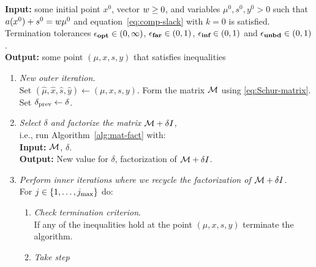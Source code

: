 \documentclass{article}
\begin{document}
\begin{algorithm}[H]
\textbf{Input:} some initial point $x^{0}$, vector $w \ge 0$, and variables $\mu^0, s^{0}, y^{0} > 0$  such that $a(x^{0}) + s^{0} = w \mu^{0}$ and equation~\eqref{eq:comp-slack} with $k=0$ is satisfied. Termination tolerances $\epsilon_{\textbf{opt}} \in (0,\infty)$, $\epsilon_{\textbf{far}} \in (0,1)$, $\epsilon_{\textbf{inf}} \in (0,1)$ and $\epsilon_{\textbf{unbd}} \in (0,1)$. \\
\textbf{Output:} some point $(\mu, x, s, y)$ that satisfies inequalities \termination{}
\vspace{0.1 cm} %
\begin{enumerate}[label*=A.{\arabic*}]
\item \label{line:form-K}  \emph{New outer iteration.} \\
Set $(\hat{\mu}, \hat{x}, \hat{s}, \hat{y}) \gets (\mu, x, s, y)$. Form the matrix $\mathcal{M}$ using \eqref{eq:Schur-matrix}. Set $\delta_{\text{prev}} \gets \delta$.
\item \emph{Select $\delta$ and factorize the matrix $\mathcal{M} + \delta I$,} \\
i.e., run Algorithm~\ref{alg:mat-fact} with: \\
\hspace*{0.1cm}  \textbf{Input:} $\mathcal{M}$, $\delta$. \\
\hspace*{0.1cm} \textbf{Output:} New value for $\delta$, factorization of $\mathcal{M} + \delta I$.
\item \label{take-steps}  \emph{Perform inner iterations where we recycle the factorization of $\mathcal{M} + \delta I$.} \\
For $j \in \{ 1, \dots , j_{\max} \}$ do:
\begin{enumerate}[label*=.{\arabic*}]
\item \emph{Check termination criterion}. \\
If any of the inequalities \termination{} hold at the point $(\mu,x,s,y)$ terminate the algorithm.
\item \emph{Take step}\label{line:take-step}

\end{enumerate}
\end{enumerate}
\end{algorithm}
\end{document}
